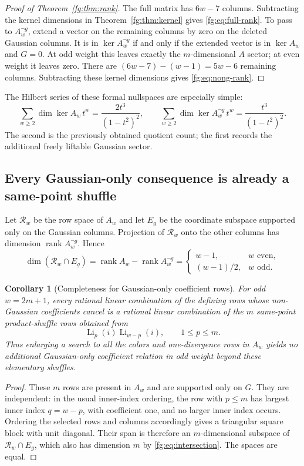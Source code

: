 \documentclass[11pt,a4paper]{article}
\newtheorem{corollary}[theorem]{Corollary}
\theoremstyle{definition}
\theoremstyle{remark}
\numberwithin{equation}{section}
\begin{document}
\begin{proof}[Proof of Theorem~\ref{fg:thm:rank}]
The full matrix has $6w-7$ columns. Subtracting the kernel dimensions
in Theorem~\ref{fg:thm:kernel} gives
\eqref{fg:eq:full-rank}. To pass to $A_w^{\neg g}$, extend a vector
on the remaining columns by zero on the deleted Gaussian columns.
It is in $\ker A_w^{\neg g}$ if and only if the extended vector is
in $\ker A_w$ and $G=0$. At odd weight this leaves exactly the
$m$-dimensional $A$ sector; at even weight it leaves zero. There
are $(6w-7)-(w-1)=5w-6$ remaining columns. Subtracting these
kernel dimensions gives \eqref{fg:eq:nong-rank}.
\end{proof}

The Hilbert series of these formal nullspaces are especially simple:
\[
 \sum_{w\ge2}\dim\ker A_w\,t^w
 =\frac{2t^3}{(1-t^2)^2},\qquad
 \sum_{w\ge2}\dim\ker A_w^{\neg g}\,t^w
 =\frac{t^3}{(1-t^2)^2}.
\]
The second is the previously obtained quotient count; the first records
the additional freely liftable Gaussian sector.

\subsection{Every Gaussian-only consequence is already a same-point shuffle}

Let $\mathcal R_w$ be the row space of $A_w$ and let $E_g$ be the
coordinate subspace supported only on the Gaussian columns.
Projection of $\mathcal R_w$ onto the other columns has dimension
$\operatorname{rank}A_w^{\neg g}$. Hence
\begin{equation}\label{fg:eq:intersection}
 \dim(\mathcal R_w\cap E_g)
 =\operatorname{rank}A_w-\operatorname{rank}A_w^{\neg g}
 =\begin{cases}
    w-1,&w\text{ even},\\
    (w-1)/2,&w\text{ odd}.
  \end{cases}
\end{equation}

\begin{corollary}[Completeness for Gaussian-only coefficient rows]
\label{fg:cor:g-only}
For odd $w=2m+1$, every rational linear combination of the defining
rows whose non-Gaussian coefficients cancel is a rational linear
combination of the $m$ same-point product-shuffle rows obtained from
\[
 \operatorname{Li}_p(i)\operatorname{Li}_{w-p}(i),
 \qquad 1\le p\le m.
\]
Thus enlarging a search to all the colors and one-divergence rows in
$A_w$ yields no additional Gaussian-only coefficient relation in
odd weight beyond these elementary shuffles.
\end{corollary}
\begin{proof}
These $m$ rows are present in $A_w$ and are supported only on $G$.
They are independent: in the usual inner-index ordering, the row
with $p\le m$ has largest inner index $q=w-p$, with coefficient
one, and no larger inner index occurs. Ordering the selected rows
and columns accordingly gives a triangular square block with unit
diagonal. Their span is therefore an $m$-dimensional subspace of
$\mathcal R_w\cap E_g$, which also has dimension $m$ by
\eqref{fg:eq:intersection}. The spaces are equal.
\end{proof}
\end{document}
